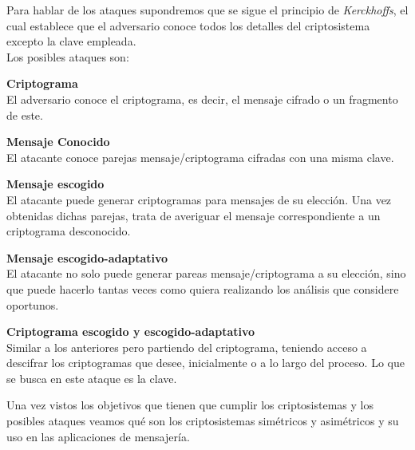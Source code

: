 Para hablar de los ataques supondremos que se sigue el principio de \emph{Kerckhoffs}, el cual establece que el adversario conoce todos los detalles del criptosistema excepto la clave empleada.\\
Los posibles ataques son:
\begin{description}
		\item \textbf{Criptograma}\\ El adversario conoce el criptograma, es decir, el mensaje cifrado o un fragmento de este.
		\item \textbf{Mensaje Conocido}\\ El atacante conoce parejas mensaje/criptograma cifradas con una misma clave.
		\item \textbf{Mensaje escogido}\\ El atacante puede generar criptogramas para mensajes de su elección. Una vez obtenidas dichas parejas, trata de averiguar el mensaje correspondiente a un criptograma desconocido.
		\item \textbf{Mensaje escogido-adaptativo}\\ El atacante no solo puede generar pareas mensaje/criptograma a su elección, sino que puede hacerlo tantas veces como quiera realizando los análisis que considere oportunos.
		\item \textbf{Criptograma escogido y escogido-adaptativo}\\ Similar a los anteriores pero partiendo del criptograma, teniendo acceso a descifrar los criptogramas que desee, inicialmente o a lo largo del proceso. Lo que se busca en este ataque es la clave.
\end{description}

Una vez vistos los objetivos que tienen que cumplir los criptosistemas y los posibles ataques veamos qué son los criptosistemas simétricos y asimétricos y su uso en las aplicaciones de mensajería.\\

